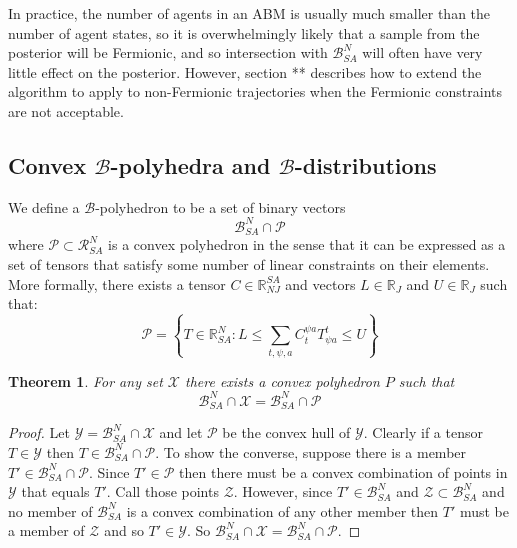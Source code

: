 \documentclass{article}
\newtheorem{theorem}{Theorem}
\begin{document}
In practice, the number of agents in an ABM is usually much smaller than the number of agent states, so it is overwhelmingly likely that a sample from the posterior will be Fermionic, and so intersection with $\mathcal{B}^N_{SA}$ will often have very little effect on the posterior. However, section ** describes how to extend the algorithm to apply to non-Fermionic trajectories when the Fermionic constraints are not acceptable.

\subsection{Convex $\mathcal{B}$-polyhedra and $\mathcal{B}$-distributions}
\label{BPoly}

We define a $\mathcal{B}$-polyhedron to be a set of binary vectors
\[
\mathcal{B}^N_{SA} \cap \mathcal{P}
\]
where $\mathcal{P} \subset \mathcal{R}^N_{SA}$ is a convex polyhedron in the sense that it can be expressed as a set of tensors that satisfy some number of linear constraints on their elements. More formally, there exists a tensor $C \in \mathbb{R}^{SA}_{NJ}$ and vectors $L \in \mathbb{R}_J$ and $U \in \mathbb{R}_J$ such that:
\[
\mathcal{P} = \left\{ T\in\mathbb{R}^N_{SA} : L \le \sum_{t,\psi,a} C^{\psi a}_{t} T^t_{\psi a} \le U \right\}
\]

\begin{theorem}
For any set $\mathcal{X}$ there exists a convex polyhedron $P$ such that
\[
\mathcal{B}^N_{SA} \cap \mathcal{X} = \mathcal{B}^N_{SA} \cap \mathcal{P}
\]
\end{theorem}
\begin{proof}
Let $\mathcal{Y} = \mathcal{B}^N_{SA} \cap \mathcal{X}$ and let $\mathcal{P}$ be the convex hull of $\mathcal{Y}$. Clearly if a tensor $T\in \mathcal{Y}$ then $T\in \mathcal{B}^N_{SA} \cap \mathcal{P}$. To show the converse, suppose there is a member $T' \in \mathcal{B}^N_{SA} \cap \mathcal{P}$. Since $T'\in \mathcal{P}$ then there must be a convex combination of points in $\mathcal{Y}$ that equals $T'$. Call those points $\mathcal{Z}$. However, since $T' \in \mathcal{B}^N_{SA}$ and $\mathcal{Z}\subset \mathcal{B}^N_{SA}$ and no member of $\mathcal{B}^N_{SA}$ is a convex combination of any other member then $T'$ must be a member of $\mathcal{Z}$ and so $T'\in \mathcal{Y}$. So $\mathcal{B}^N_{SA} \cap \mathcal{X} = \mathcal{B}^N_{SA} \cap \mathcal{P}$. 
\end{proof}
\end{document}
